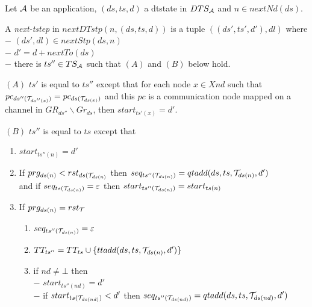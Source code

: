 \documentclass{article}
\begin{document}
\begin{definition}\label{def-dtstep} Let ${\cal A}$ be an application, $(ds,ts,d)$ a dtstate in $DTS_{\cal A}$ and $n\in nextN\!d(ds)$.\par 
A {\em next-tstep} in $nextDT\!stp(n,(ds,ts,d))$ is a tuple $((ds',ts',d'),dl)$ where\\
$-$ $(ds',dl)\in nextStp(ds,n)$\\
$-$ $d'=d+nextT\!o(ds)$\\
$-$ there is $ts''\in TS_{\cal A}$ such that $(A)$ and $(B)$ below hold.

\vspace{1.5mm}
$(A)$ $ts'$ is equal to $ts''$ except that for each node $x\in X\!nd$ such that $pc_{ds''({\cal T}_{ds''(x)})}=pc_{ds({\cal T}_{ds(x)})}$ and this $pc$ is a communication node mapped on a channel in $GR_{ds''}\backslash Gr_{ds}$, then $start_{ts'(x)}=d'$.

\vspace{1mm}
$(B)$ $ts''$ is equal to $ts$ except that
\begin{enumerate}

\item $start_{ts''(n)}=d'$
		  
\item If $prg_{ds(n)}< rst_{ds({\cal T}_{ds(n)}}$ then $seq_{ts''({\cal T}_{ds(n)})}=qtadd(ds,ts,{\cal T}_{ds(n)},d')$\\ \hspace*{5mm} and if $seq_{ts({\cal T}_{ds(n)})}=\varepsilon$ then $start_{ts''({\cal T}_{ds(n)})}=start_{ts(n)}$

\item If $prg_{ds(n)}= rst_{\cal T}$
      \begin{enumerate}
			\item $seq_{ts''({\cal T}_{ds(n)})}=\varepsilon$
			\item $TT_{ts''}=TT_{ts}\cup \{ttadd(ds,ts,{\cal T}_{ds(n)},d')\} $
      \item if $nd\neq\bot$ then\\
			$-$ $start_{ts''(nd)}=d'$\\
			$-$ if $start_{ts({\cal T}_{ds(nd)})}<d'$ then $seq_{ts''({\cal T}_{ds(nd)})}=qtadd(ds,ts,{\cal T}_{ds(nd)},d')$
			\end{enumerate}
\end{enumerate}
\end{definition}
\end{document}
